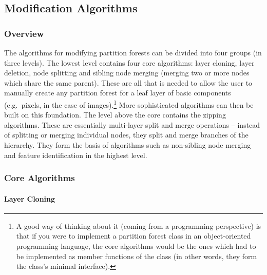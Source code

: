 \subsection{Modification Algorithms}

\subsubsection{Overview}

The algorithms for modifying partition forests can be divided into four groups (in three levels). The lowest level contains four core algorithms: layer cloning, layer deletion, node splitting and sibling node merging (merging two or more nodes which share the same parent). These are all that is needed to allow the user to manually create any partition forest for a leaf layer of basic components (e.g.~pixels, in the case of images).\footnote{A good way of thinking about it (coming from a programming perspective) is that if you were to implement a partition forest class in an object-oriented programming language, the core algorithms would be the ones which had to be implemented as member functions of the class (in other words, they form the class's minimal interface).} More sophisticated algorithms can then be built on this foundation. The level above the core contains the zipping algorithms. These are essentially multi-layer split and merge operations -- instead of splitting or merging individual nodes, they split and merge branches of the hierarchy. They form the basis of algorithms such as non-sibling node merging and feature identification in the highest level.

\subsubsection{Core Algorithms}

\paragraph{Layer Cloning}

